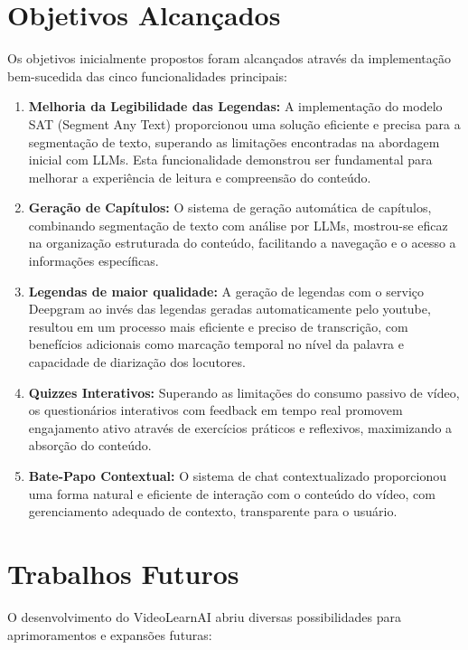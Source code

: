 \documentclass[tcc,capa]{texufpel}
\begin{document}
\section{Objetivos Alcançados}

Os objetivos inicialmente propostos foram alcançados através da implementação bem-sucedida das cinco funcionalidades principais:

\begin{enumerate}
    \item \textbf{Melhoria da Legibilidade das Legendas:} A implementação do modelo SAT (Segment Any Text) proporcionou uma solução eficiente e precisa para a segmentação de texto, superando as limitações encontradas na abordagem inicial com LLMs. Esta funcionalidade demonstrou ser fundamental para melhorar a experiência de leitura e compreensão do conteúdo.

    \item \textbf{Geração de Capítulos:} O sistema de geração automática de capítulos, combinando segmentação de texto com análise por LLMs, mostrou-se eficaz na organização estruturada do conteúdo, facilitando a navegação e o acesso a informações específicas.

    \item \textbf{Legendas de maior qualidade:} A geração de legendas com o serviço Deepgram ao invés das legendas geradas automaticamente pelo youtube, resultou em um processo mais eficiente e preciso de transcrição, com benefícios adicionais como marcação temporal no nível da palavra e capacidade de diarização dos locutores.

    \item \textbf{Quizzes Interativos:} Superando as limitações do consumo passivo de vídeo, os questionários interativos com feedback em tempo real promovem engajamento ativo através de exercícios práticos e reflexivos, maximizando a absorção do conteúdo.

    \item \textbf{Bate-Papo Contextual:} O sistema de chat contextualizado proporcionou uma forma natural e eficiente de interação com o conteúdo do vídeo, com gerenciamento adequado de contexto, transparente para o usuário.
\end{enumerate}

\section{Trabalhos Futuros}

O desenvolvimento do VideoLearnAI abriu diversas possibilidades para aprimoramentos e expansões futuras:
\end{document}
